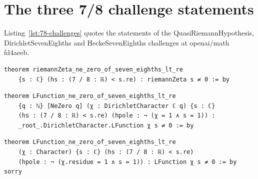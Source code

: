 \section{The three 7/8 challenge statements}\label{app:78-listings}

Listing~\ref{lst:78-challenges} quotes the statements of the QuasiRiemannHypothesis, DirichletSevenEighths and HeckeSevenEighths challenges at openai/math fd4aeeb. %

\begin{listing}[tbp]
\caption{The 7/8 challenges at openai/math fd4aeeb: lean/ComparatorChallenges/QuasiRiemannHypothesis.lean:5-6 (sha256 065f8c9a\ldots), DirichletSevenEighths.lean:8-11 (sha256 8fb13ad9\ldots) and HeckeSevenEighths.lean:237-239 (sha256 cb5e404f\ldots).}\label{lst:78-challenges} %
\begin{Verbatim}
theorem riemannZeta_ne_zero_of_seven_eighths_lt_re
    {s : ℂ} (hs : (7 / 8 : ℝ) < s.re) : riemannZeta s ≠ 0 := by
\end{Verbatim}
\begin{Verbatim}
theorem LFunction_ne_zero_of_seven_eighths_lt_re
    {q : ℕ} [NeZero q] (χ : DirichletCharacter ℂ q) {s : ℂ}
    (hs : (7 / 8 : ℝ) < s.re) (hpole : ¬ (χ = 1 ∧ s = 1)) :
    _root_.DirichletCharacter.LFunction χ s ≠ 0 := by
\end{Verbatim}
\begin{Verbatim}
theorem LFunction_ne_zero_of_seven_eighths_lt_re
    (χ : Character) {s : ℂ} (hs : (7 / 8 : ℝ) < s.re)
    (hpole : ¬ (χ.residue = 1 ∧ s = 1)) : LFunction χ s ≠ 0 := by sorry
\end{Verbatim}
\end{listing}
